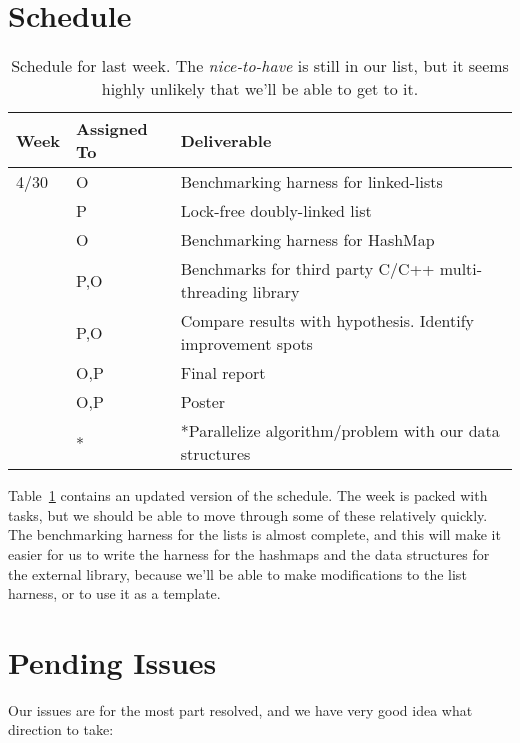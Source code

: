 \documentclass[11pt]{article}
\begin{document}
\section*{Schedule}
\begin{table}[t]
\begin{center}
\begin{tabular}{lll}
\toprule
\bf Week & \bf Assigned To  & \bf Deliverable   \\
\midrule
4/30     & O     & Benchmarking harness for linked-lists \\
         & P     & Lock-free doubly-linked list \\
         & O     & Benchmarking harness for HashMap \\
         & P,O   & Benchmarks for third party C/C++ multi-threading library \\
         & P,O   & Compare results with hypothesis. Identify improvement spots \\
         & O,P   & Final report \\
         & O,P   & Poster \\
         & *     & *Parallelize algorithm/problem with our data structures \\
\bottomrule
\end{tabular}
\caption{
Schedule for last week. The {\it nice-to-have} is still in our list, but it
seems highly unlikely that we'll be able to get to it.
}
\label{table:sche}
\end{center}
\end{table}

Table~\ref{table:sche} contains an updated version of the schedule. The week is
packed with tasks, but we should be able to move through some of these
relatively quickly. The benchmarking harness for the lists is almost complete,
and this will make it easier for us to write the harness for the hashmaps and
the data structures for the external library, because we'll be able to make
modifications to the list harness, or to use it as a template.

\section*{Pending Issues}
Our issues are for the most part resolved, and we have very good idea what
direction to take:
\end{document}
